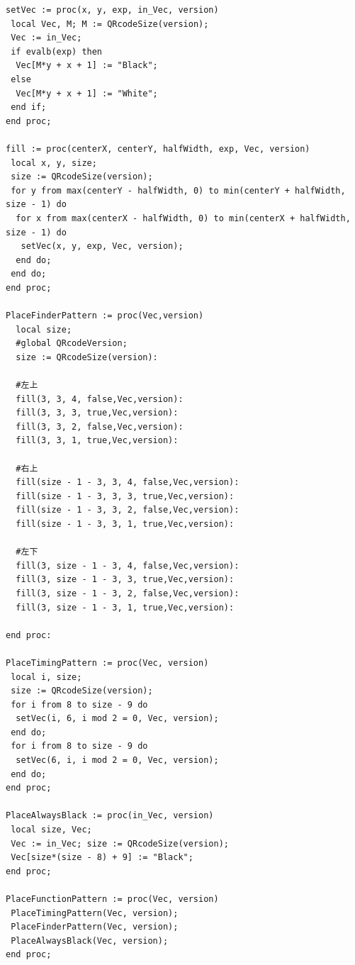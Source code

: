 \documentclass{thesis}
\begin{document}
\begin{lstlisting}
setVec := proc(x, y, exp, in_Vec, version)
 local Vec, M; M := QRcodeSize(version);
 Vec := in_Vec;
 if evalb(exp) then
  Vec[M*y + x + 1] := "Black";
 else
  Vec[M*y + x + 1] := "White";
 end if; 
end proc;

fill := proc(centerX, centerY, halfWidth, exp, Vec, version)
 local x, y, size;
 size := QRcodeSize(version);
 for y from max(centerY - halfWidth, 0) to min(centerY + halfWidth, size - 1) do
  for x from max(centerX - halfWidth, 0) to min(centerX + halfWidth, size - 1) do
   setVec(x, y, exp, Vec, version);
  end do;
 end do; 
end proc;

PlaceFinderPattern := proc(Vec,version) 
  local size; 
  #global QRcodeVersion; 
  size := QRcodeSize(version):
 
  #左上
  fill(3, 3, 4, false,Vec,version):
  fill(3, 3, 3, true,Vec,version):
  fill(3, 3, 2, false,Vec,version):
  fill(3, 3, 1, true,Vec,version):

  #右上
  fill(size - 1 - 3, 3, 4, false,Vec,version):
  fill(size - 1 - 3, 3, 3, true,Vec,version):
  fill(size - 1 - 3, 3, 2, false,Vec,version):
  fill(size - 1 - 3, 3, 1, true,Vec,version):

  #左下
  fill(3, size - 1 - 3, 4, false,Vec,version):
  fill(3, size - 1 - 3, 3, true,Vec,version):
  fill(3, size - 1 - 3, 2, false,Vec,version):
  fill(3, size - 1 - 3, 1, true,Vec,version):

end proc:

PlaceTimingPattern := proc(Vec, version)
 local i, size;
 size := QRcodeSize(version);
 for i from 8 to size - 9 do
  setVec(i, 6, i mod 2 = 0, Vec, version);
 end do;
 for i from 8 to size - 9 do
  setVec(6, i, i mod 2 = 0, Vec, version);
 end do; 
end proc;

PlaceAlwaysBlack := proc(in_Vec, version)
 local size, Vec;
 Vec := in_Vec; size := QRcodeSize(version);
 Vec[size*(size - 8) + 9] := "Black"; 
end proc;

PlaceFunctionPattern := proc(Vec, version) 
 PlaceTimingPattern(Vec, version);
 PlaceFinderPattern(Vec, version);
 PlaceAlwaysBlack(Vec, version);
end proc;


\end{lstlisting}
\end{document}
